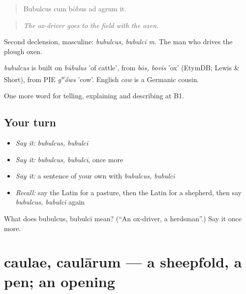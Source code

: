 \begin{quote}
Bubulcus cum bōbus ad agrum it.
\end{quote}

\begin{quote}
\emph{The ox-driver goes to the field with the oxen.}
\end{quote}

Second declension, masculine: \emph{bubulcus, bubulcī m.} The man who drives the plough oxen.

\begin{cousinweb}
\emph{bubulcus} is built on \emph{būbulus} 'of cattle', from \emph{bōs, bovis} 'ox' (EtymDB; Lewis \& Short), from PIE \emph{g\textsuperscript{w}\'{\={o}}ws} 'cow'. English \emph{cow} is a Germanic cousin.
\end{cousinweb}

\begin{grammarlens}[title={What you've built}]
One more word for telling, explaining and describing at B1.
\end{grammarlens}

\subsection*{Your turn}
\begin{itemize}
\raggedright
  \item \emph{Say it:} \emph{bubulcus, bubulcī}
  \item \emph{Say it:} \emph{bubulcus, bubulcī}, once more
  \item \emph{Say it:} a sentence of your own with \emph{bubulcus, bubulcī}
  \item \emph{Recall:} say the Latin for a pasture, then the Latin for a shepherd, then say \emph{bubulcus, bubulcī} again
\end{itemize}

\begin{tcolorbox}[breakable,colback=teal!4,colframe=teal!35!black,title={Before you move on}]
What does bubulcus, bubulcī mean? (\textquotedblleft{}An ox-driver, a herdsman\textquotedblright{}.) Say it once more.
\end{tcolorbox}
\section[caulae, caulārum]{caulae, caulārum — a sheepfold, a pen; an opening}

\label{lesson:LA-C478-caulae}



